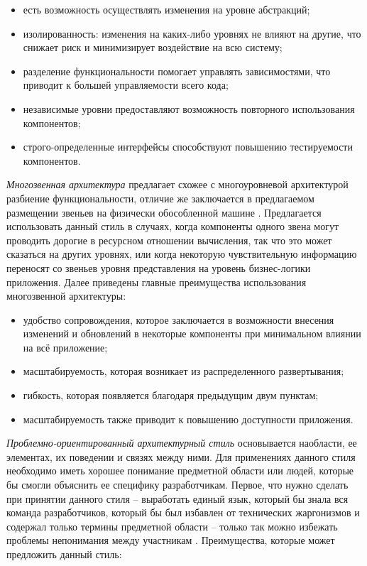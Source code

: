 \begin{itemize}
	\item есть возможность осуществлять изменения на уровне абстракций;
	\item изолированность: изменения на каких-либо уровнях не влияют на другие, что снижает риск и минимизирует воздействие на всю систему;
	\item разделение функциональности помогает управлять зависимостями, что приводит к большей управляемости всего кода;
	\item независимые уровни предоставляют возможность повторного использования компонентов;
	\item строго-определенные интерфейсы способствуют повышению тестируемости компонентов.
\end{itemize}

\emph{Многозвенная архитектура} предлагает схожее с многоуровневой архитектурой разбиение функциональности, отличие же заключается в предлагаемом размещении звеньев на физически обособленной машине \cite{architecture_volosevich}. Предлагается использовать данный стиль в случаях, когда компоненты одного звена могут проводить дорогие в ресурсном отношении вычисления, так что это может сказаться на других уровнях, или когда некоторую чувствительную информацию переносят со звеньев уровня представления на уровень бизнес-логики приложения. Далее приведены главные преимущества использования многозвенной архитектуры:

\begin{itemize}
	\item удобство сопровождения, которое заключается в возможности внесения изменений и обновлений в некоторые компоненты при минимальном влиянии на всё приложение;
	\item масштабируемость, которая возникает из распределенного развертывания;
	\item гибкость, которая появляется благодаря предыдущим двум пунктам;
	\item масштабируемость также приводит к повышению доступности приложения.
\end{itemize}

\emph{Проблемно-ориентированный архитектурный стиль} основывается на области, ее элементах, их поведении и связях между ними. Для применениях данного стиля необходимо иметь хорошее понимание предметной области или людей, которые бы смогли объяснить ее специфику разработчикам. Первое, что нужно сделать при принятии данного стиля -- выработать единый язык, который бы знала вся команда разработчиков, который бы был избавлен от технических жаргонизмов и содержал только термины предметной области -- только так можно избежать проблемы непонимания между участникам \cite{ddd_quickly}. Преимущества, которые может предложить данный стиль:

